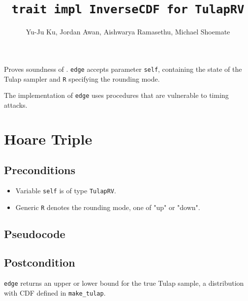 \documentclass{article}
\title{\texttt{trait impl InverseCDF for TulapRV}}
\author{Yu-Ju Ku, Jordan Awan, Aishwarya Ramasethu, Michael Shoemate}
\begin{document}
\maketitle

\contrib

Proves soundness of .
\texttt{edge} accepts parameter \texttt{self}, containing the state of the Tulap sampler and \texttt{R} specifying the rounding mode.
\floatingPoint

\begin{tcolorbox}
    \begin{warning}
        The implementation of \texttt{edge} uses procedures that are vulnerable to timing attacks. 
    \end{warning}
\end{tcolorbox}


\section{Hoare Triple}

\subsection*{Preconditions}
\begin{itemize}
    \item Variable \texttt{self} is of type \texttt{TulapRV}.
    \item Generic \texttt{R} denotes the rounding mode, one of "up" or "down".
\end{itemize}

\subsection*{Pseudocode}



\subsection*{Postcondition}

\begin{theorem}

\texttt{edge} returns an upper or lower bound for the true Tulap sample,
a distribution with CDF defined in \texttt{make\_tulap}.
\end{theorem}
\end{document}
